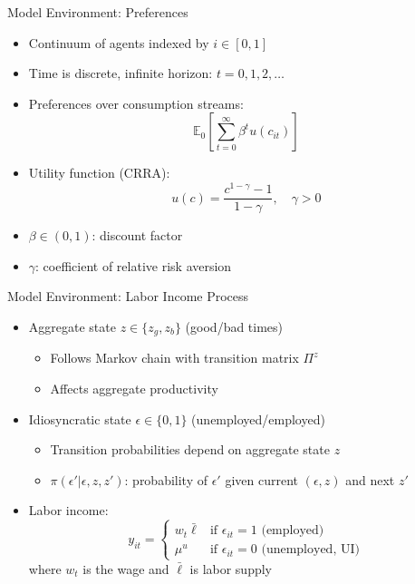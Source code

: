 \documentclass[aspectratio=169]{beamer}
\newcommand{\E}{\mathbb{E}}
\newcommand{\1}{\mathbf{1}}
\begin{document}

\begin{frame}{Model Environment: Preferences}
  \begin{itemize}
      \item Continuum of agents indexed by $i \in [0,1]$
      \item Time is discrete, infinite horizon: $t = 0, 1, 2, \ldots$
      \item Preferences over consumption streams:
      \[
      \E_0 \left[ \sum_{t=0}^{\infty} \beta^t u(c_{it}) \right]
      \]
      \item Utility function (CRRA):
      \[
      u(c) = \frac{c^{1-\gamma} - 1}{1-\gamma}, \quad \gamma > 0
      \]
      \item $\beta \in (0,1)$: discount factor
      \item $\gamma$: coefficient of relative risk aversion
  \end{itemize}
\end{frame}

\begin{frame}{Model Environment: Labor Income Process}
  \begin{itemize}
      \item Aggregate state $z \in \{z_g, z_b\}$ (good/bad times)
      \begin{itemize}
          \item Follows Markov chain with transition matrix $\Pi^z$
          \item Affects aggregate productivity
      \end{itemize}
      \item Idiosyncratic state $\epsilon \in \{0, 1\}$ (unemployed/employed)
      \begin{itemize}
          \item Transition probabilities depend on aggregate state $z$
          \item $\pi(\epsilon' | \epsilon, z, z')$: probability of $\epsilon'$ given current $(\epsilon, z)$ and next $z'$
      \end{itemize}
      \item Labor income:
      \[
      y_{it} = 
      \begin{cases}
      w_t \bar{\ell} & \text{if } \epsilon_{it} = 1 \text{ (employed)} \\
      \mu^u & \text{if } \epsilon_{it} = 0 \text{ (unemployed, UI)}
      \end{cases}
      \]
      where $w_t$ is the wage and $\bar{\ell}$ is labor supply
  \end{itemize}
\end{frame}
\end{document}
